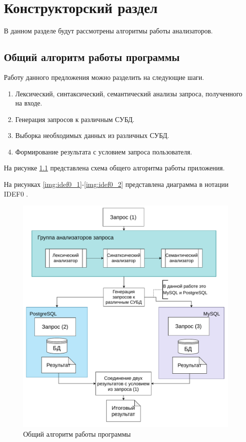 \chapter{Конструкторский раздел}

В данном разделе будут рассмотрены алгоритмы работы анализаторов.

\section{Общий алгоритм работы программы}

Работу данного предложения можно разделить на следующие шаги.
\begin{enumerate}
	\item Лексический, синтаксический, семантический анализы запроса, полученного на входе.
	\item Генерация запросов к различным СУБД.
	\item Выборка необходимых данных из различных СУБД.
	\item Формирование результата с условием запроса пользователя.
\end{enumerate}

На рисунке \ref{img:img1} представлена схема общего алгоритма работы приложения.

На рисунках \ref{img:idef0_1}-\ref{img:idef0_2} представлена диаграмма в нотации IDEF0 \cite{idef0}.

\begin{figure}[h!]
	\begin{center}
		\includegraphics[scale=0.7]{./inc/img/obshalg.pdf}
		\caption{Общий алгоритм работы программы}
		\label{img:img1}
	\end{center}
\end{figure}


